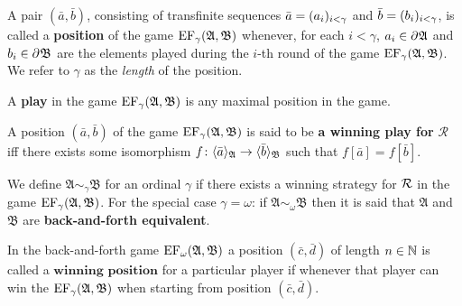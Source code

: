 \begin{dfn}[Position]
	A pair $(\bar{a},\bar{b})$, consisting of transfinite sequences $\bar{a}=(a_i)_{i<\gamma}$ and $\bar{b}=(b_i)_{i<\gamma}$, is called a \textbf{position} of the game $\operatorname{EF}_\gamma(\mathfrak{A},\mathfrak{B})$ whenever, for each $i<\gamma$, $a_i\in\partial^{}\mathfrak{A}$ and $b_i\in\partial^{}\mathfrak{B}$ are the elements played during the $i$-th round of the game $\operatorname{EF}_\gamma(\mathfrak{A},\mathfrak{B})$.  We refer to $\gamma$ as the \textit{length} of the position.
\end{dfn}

\begin{dfn}[Play]
	A \textbf{play} in the game $\operatorname{EF}_\gamma(\mathfrak{A},\mathfrak{B})$ is any maximal position in the game.
\end{dfn}

\begin{dfn}
	A position $(\bar{a},\bar{b})$ of the game $\operatorname{EF}_\gamma(\mathfrak{A},\mathfrak{B})$ is said to be \textbf{a winning play for} $\bm{\mathcal{R}}$ iff there exists some isomorphism $f\colon\langle \bar{a}\rangle_{\mathfrak{A}}\to\langle \bar{b}\rangle_{\mathfrak{B}}$ such that $f[\bar{a}]=f[\bar{b}]$.
\end{dfn}

\begin{dfn}
	We define $\mathfrak{A}\sim_\gamma\mathfrak{B}$ for an ordinal $\gamma$ if there exists a winning strategy for $\mathcal{R}$ in the game $\operatorname{EF}_\gamma(\mathfrak{A},\mathfrak{B})$.  For the special case $\gamma=\omega$: if $\mathfrak{A}\sim_\omega\mathfrak{B}$ then it is said that $\mathfrak{A}$ and $\mathfrak{B}$ are \textbf{back-and-forth equivalent}.
\end{dfn}

\begin{dfn}
	In the back-and-forth game $\operatorname{EF}_\omega(\mathfrak{A},\mathfrak{B})$ a position $(\bar{c},\bar{d})$ of length $n\in\mathbb{N}$ is called a $\textbf{winning position}$ for a particular player if whenever that player can win the $\operatorname{EF}_\gamma(\mathfrak{A},\mathfrak{B})$ when starting from position $(\bar{c},\bar{d})$.
\end{dfn}

